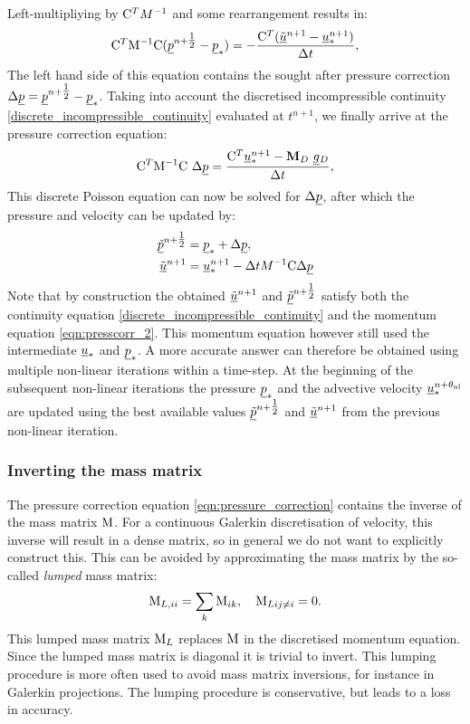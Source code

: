 Left-multipliying by $\mathrm{C}^TM^{-1}$ and
some rearrangement results in:
\begin{equation*}
  \mathrm{C}^T \mathrm{M^{-1}}\mathrm{C} ( \underline{p}^{n+\tfrac 12} -  \underline{p}_*)
  =-\frac{\mathrm{C}^T  ({\underline{\tilde u}^{n+1}-\underline{u}_*^{n+1}})}{\Delta t},
\end{equation*}
The left hand side of this equation contains the sought after pressure
correction $\Delta\underline{p}=\underline{p}^{n+\tfrac 12}-\underline{p}_*$.
Taking into account the discretised incompressible continuity
\eqref{discrete_incompressible_continuity} evaluated at
$t^{n+1}$, we finally arrive at the pressure correction equation:
\begin{equation}
 \mathrm{C}^T \mathrm{M^{-1}}\mathrm{C}~\Delta\underline{p}
   =\frac{ \mathrm{C}^T \underline{u}_*^{n+1}-{\mbox{\boldmath$\mathrm{M}$}}_D ~\underline{g}{}_D}{\Delta t},
   \label{eqn:pressure_correction}
\end{equation}
This discrete Poisson equation can now be solved
for $\Delta\underline{p}$, after which the pressure and velocity can
be updated by:
\begin{equation*}
\begin{split}
  \underline{\tilde p}^{n+\tfrac 12} &= \underline{p}_* + \Delta\underline{p}, \\
  \underline{\tilde u}^{n+1} &= \underline{u}_*^{n+1}
  -\Delta t  M^{-1} \mathrm{C} \Delta\underline{p}
\end{split}
\end{equation*}
Note that by construction the obtained $\underline{\tilde u}^{n+1}$ and
$\underline{\tilde p}^{n+\tfrac 12}$ satisfy both the continuity equation
\eqref{discrete_incompressible_continuity} and the momentum equation
\eqref{eqn:presscorr_2}. This momentum equation however still used
the intermediate $\underline{u}_*$ and $\underline{p}_*$.
A more accurate answer can therefore
be obtained using multiple non-linear iterations within a
time-step. At the beginning of the subsequent non-linear iterations
the pressure $\underline{p}_*$ and the advective velocity
$\underline{u}_*^{n+\theta_{\mathrm{nl}}}$ are updated using the best available values
$\underline{\tilde p}^{n+\tfrac 12}$ and $\underline{\tilde u}^{n+1}$ from the previous
non-linear iteration.

\subsubsection{Inverting the mass matrix}
\label{Sect:ND_cg_mass_lumping}
The pressure correction equation \eqref{eqn:pressure_correction} contains
the inverse of the mass matrix $\mathrm{M}$. For a continuous Galerkin
discretisation of velocity, this inverse will result in a dense
matrix, so in general we do not want to explicitly construct
this. This can be avoided by approximating the mass matrix by the
so-called \emph{lumped} mass matrix:
\begin{equation*}
  \mathrm{M}_{L,ii}=\sum_k \mathrm{M}_{ik},\quad \mathrm{M}_{Lij\neq i}=0.
\end{equation*}
This lumped mass matrix $\mathrm{M}_L$ replaces $\mathrm{M}$ in the
discretised momentum equation. Since the lumped mass matrix is
diagonal it is trivial to invert. This lumping procedure is more
often used to avoid mass matrix inversions, for instance in
Galerkin projections. The lumping procedure is conservative,
but leads to a loss in accuracy.


